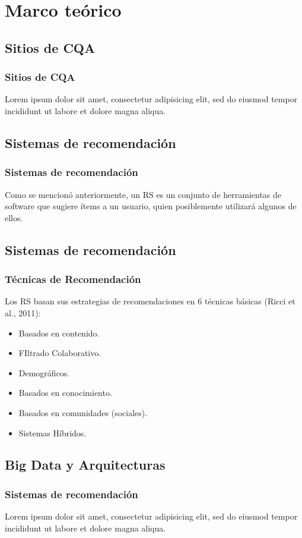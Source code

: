 \section{Marco teórico}
\subsection{Sitios de CQA}
\begin{frame}[allowframebreaks]
	\frametitle{Sitios de CQA}
	Lorem ipsum dolor sit amet, consectetur adipisicing elit, sed do eiusmod tempor incididunt ut labore et dolore magna aliqua.
\end{frame}

\subsection{Sistemas de recomendación}
\begin{frame}[allowframebreaks]
	\frametitle{Sistemas de recomendación}
	Como se mencionó anteriormente, un RS es un conjunto de herramientas de software que sugiere ítems a un usuario, quien posiblemente utilizará algunos de ellos.
\end{frame}

\subsection{Sistemas de recomendación}
\begin{frame}
	\frametitle{Técnicas de Recomendación}
	Los RS basan sus estrategias de recomendaciones en 6 técnicas básicas (Ricci et al., 2011):
	\begin{itemize} [<+>]
		\item Basados en contenido.
		\item FIltrado Colaborativo.
		\item Demográficos.
		\item Basados en conocimiento.
		\item Basados en comunidades (sociales).
		\item Sistemas Híbridos.
	\end{itemize}
\end{frame}

\subsection{Big Data y Arquitecturas}
\begin{frame}[allowframebreaks]
	\frametitle{Sistemas de recomendación}
	Lorem ipsum dolor sit amet, consectetur adipisicing elit, sed do eiusmod tempor incididunt ut labore et dolore magna aliqua.
\end{frame}

